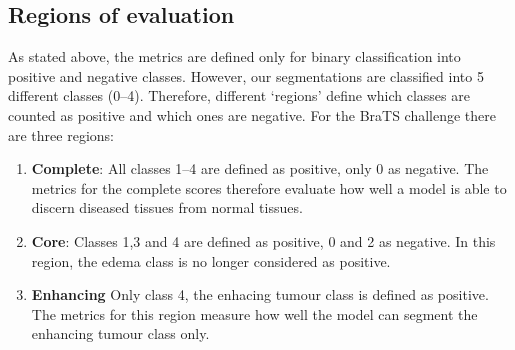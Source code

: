 \documentclass[12pt,a4paper,twoside,openright]{report}
\begin{document}
\subsection{Regions of evaluation}
As stated above, the metrics are defined only for binary classification into positive and negative classes. However, our segmentations are classified into 5 different classes (0--4). Therefore, different `regions' define which classes are counted as positive and which ones are negative. For the BraTS challenge there are three regions:
\begin{enumerate}
	\item \textbf{Complete}: All classes 1--4 are defined as positive, only 0 as negative. The metrics for the complete scores therefore evaluate how well a model is able to discern diseased tissues from normal tissues.
	\item \textbf{Core}: Classes 1,3 and 4 are defined as positive, 0 and 2 as negative. In this region, the edema class is no longer considered as positive.
	\item \textbf{Enhancing} Only class 4, the enhacing tumour class is defined as positive. The metrics for this region measure how well the model can segment the enhancing tumour class only.
\end{enumerate}
\end{document}
